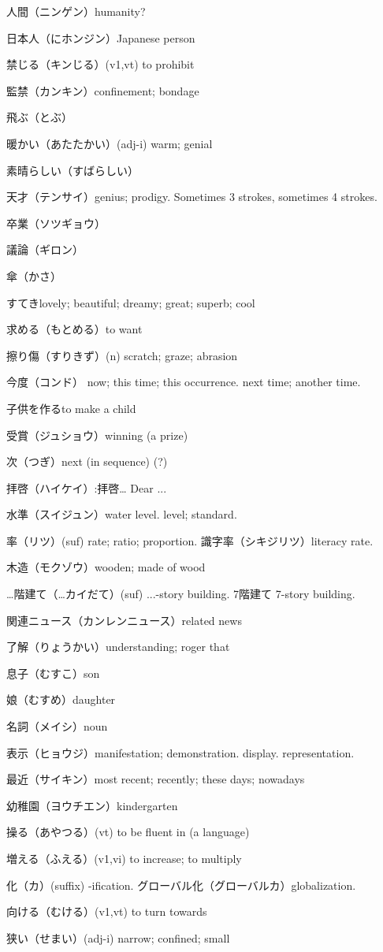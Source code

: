 人間（ニンゲン）humanity?

日本人（にホンジン）Japanese person

禁じる（キンじる）(v1,vt) to prohibit

監禁（カンキン）confinement; bondage


飛ぶ（とぶ）

暖かい（あたたかい）(adj-i) warm; genial

素晴らしい（すばらしい）

天才（テンサイ）genius; prodigy.
Sometimes 3 strokes, sometimes 4 strokes.

卒業（ソツギョウ）

議論（ギロン）

傘（かさ）

すてきlovely; beautiful; dreamy; great; superb; cool

求める（もとめる）to want

擦り傷（すりきず）(n) scratch; graze; abrasion

今度（コンド）
now; this time; this occurrence.
next time; another time.

子供を作るto make a child

受賞（ジュショウ）winning (a prize)

次（つぎ）next (in sequence) (?)

拝啓（ハイケイ）:拝啓… Dear ...

水準（スイジュン）water level. level; standard.

率（リツ）(suf) rate; ratio; proportion.
識字率（シキジリツ）literacy rate.

木造（モクゾウ）wooden; made of wood

…階建て（…カイだて）(suf) ...-story building.
7階建て 7-story building.

関連ニュース（カンレンニュース）related news

了解（りょうかい）understanding; roger that

息子（むすこ）son

娘（むすめ）daughter

名詞（メイシ）noun

表示（ヒョウジ）manifestation; demonstration. display. representation.

最近（サイキン）most recent; recently; these days; nowadays

幼稚園（ヨウチエン）kindergarten

操る（あやつる）(vt) to be fluent in (a language)

増える（ふえる）(v1,vi) to increase; to multiply

化（カ）(suffix) -ification.
グローバル化（グローバルカ）globalization.

向ける（むける）(v1,vt) to turn towards

狭い（せまい）(adj-i) narrow; confined; small
